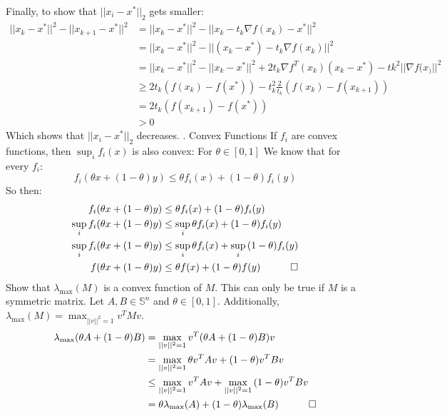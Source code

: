 \documentclass{article}
\begin{document}
Finally, to show that $||x_i - x^* ||_2$ gets smaller:
\begin{align*}
	|| x_k - x^* ||^2 - || x_{k+1} - x^* ||^2 &= || x_k - x^*||^2 - ||x_k - t_k \nabla f(x_k) - x^*||^2 \\
	&= || x_k - x^*||^2 - ||( x_k - x^*) - t_k\nabla f(x_k)||^2 \\
	&= || x_k - x^*||^2 - || x_k - x^*||^2 + 2t_k \nabla f^T(x_k)(x_k - x^*) - tk^2 || \nabla f(x_)||^2 \\
	&\geq 2t_k( f(x_k) - f(x^*)) - t_k^2 \frac{2}{t_k}(f(x_k) - f(x_{k+1})) \\
	&= 2t_k(f(x_{k+1})- f(x^*)) \\
	&> 0
\end{align*}
Which shows that $||x_i - x^* ||_2$ decreases.
\newpage
{}. Convex Functions
\newline
\newline
\noindent
If $f_i$ are convex functions, then $\sup_i f_i(x)$ is also convex: \newline
For $\theta \in [0, 1]$
We know that for every $f_i$:
\begin{equation*}
	f_i(\theta x + (1-\theta)y) \leq \theta f_i(x) + (1-\theta)f_i(y)
\end{equation*}
So then:
\begin{align*}
	f_i(\theta x + (1-\theta)y) &\leq \theta f_i(x) + (1-\theta)f_i(y) \\
	\sup_i{f_i(\theta x + (1-\theta)y)} &\leq \sup_i{\theta f_i(x) + (1-\theta)f_i(y)} \\
	\sup_i{f_i(\theta x + (1-\theta)y)} &\leq \sup_i{\theta f_i(x)} + \sup_i{(1-\theta)f_i(y)} \\
	f(\theta x + (1 - \theta)y) &\leq \theta f(x) + (1-\theta)f(y) \quad \qed
\end{align*}
Show that $\lambda_{\text{max}}(M)$ is a convex function of $M$. This can only be true if $M$ is a symmetric matrix. 
Let $A, B \in \mathbb{S}^n$ and $\theta \in [0, 1]$. Additionally, $\lambda_{\text{max}}(M) = \max_{||v||^2=1} v^TMv$. 
\begin{align*}
	\lambda_{\text{max}}(\theta A + (1 - \theta) B) &= \max_{||v||^2 = 1} v^T(\theta A + (1 - \theta)B)v \\
	&= \max_{||v||^2 = 1} {\theta v^TAv + (1-\theta)v^TBv} \\
	&\leq \max_{||v||^2 = 1} {v^TAv} + \max_{||v||^2 = 1} {(1-\theta)v^TBv} \\
	&= \theta\lambda_{\text{max}}(A) + (1-\theta)\lambda_{\text{max}}(B) \quad \qed
\end{align*}
\end{document}
